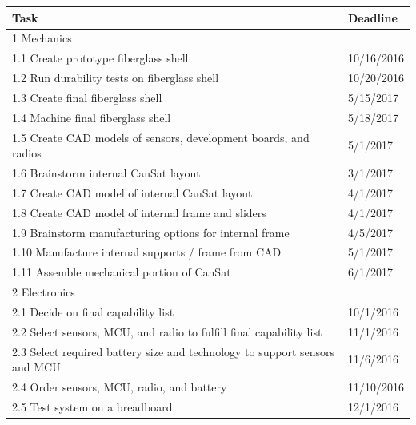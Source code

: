 \documentclass[]{report}
\begin{document}
\begin{center}
	\begin{longtable}{ll}
		\textbf{Task}	                                                                        & \textbf{Deadline}   \\  \hline
		1 Mechanics                                                                 &            \\ \hline
		1.1 Create prototype fiberglass shell                                       & 10/16/2016 \\
		1.2 Run durability tests on fiberglass shell                                & 10/20/2016 \\
		1.3 Create final fiberglass shell                                           & 5/15/2017  \\
		1.4 Machine final fiberglass shell                                          & 5/18/2017  \\
		1.5 Create CAD models of sensors, development boards, and radios            & 5/1/2017   \\
		1.6 Brainstorm internal CanSat layout                                       & 3/1/2017   \\
		1.7 Create CAD model of internal CanSat layout                              & 4/1/2017   \\
		1.8 Create CAD model of internal frame and sliders                          & 4/1/2017   \\
		1.9 Brainstorm manufacturing options for internal frame                     & 4/5/2017   \\
		1.10 Manufacture internal supports / frame from CAD                         & 5/1/2017   \\
		1.11 Assemble mechanical portion of CanSat                                  & 6/1/2017   \\ \hline
		2 Electronics                                                               &            \\ \hline
		2.1 Decide on final capability list                                         & 10/1/2016  \\
		2.2 Select sensors, MCU, and radio to fulfill final capability list         & 11/1/2016  \\
		2.3 Select required battery size and technology to support sensors and MCU  & 11/6/2016  \\
		2.4 Order sensors, MCU, radio, and battery                                  & 11/10/2016 \\
		2.5 Test system on a breadboard                                             & 12/1/2016  \\

\end{longtable}
\end{center}
\end{document}
